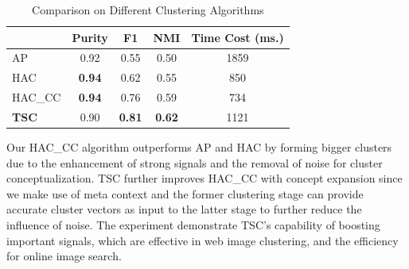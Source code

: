 
\begin{table}[th]
\centering
\small
\caption{Comparison on Different Clustering Algorithms}
\begin{tabular}{|l|c|c|c|c|}
\hline
     &        Purity &   F1 &    NMI  & Time Cost (ms.)\\
\hline
       AP  &        0.92 &   	0.55 &	      0.50 & 1859\\
\hline
    HAC & {\bf 0.94} & 0.62 & 0.55 & 850\\
\hline
        HAC\_CC &       {\bf 0.94} &       0.76 &        0.59 & 734\\
\hline
    {\bf  TSC} &       0.90 &      {\bf 0.81} &     {\bf 0.62} & 1121\\
\hline
\end{tabular}
\label{tab:clusteringeval}
\end{table}

Our HAC\_CC algorithm outperforms AP
and HAC by forming bigger clusters due
to the enhancement of strong signals and the removal of noise for
cluster conceptualization.
TSC further improves HAC\_CC with concept expansion
since we make use of meta context and
the former clustering stage can provide accurate cluster vectors
as input to the latter stage to further reduce the influence of noise.
The experiment demonstrate TSC's capability of boosting important
signals, which are effective in web image clustering, and
the efficiency for online image search.


